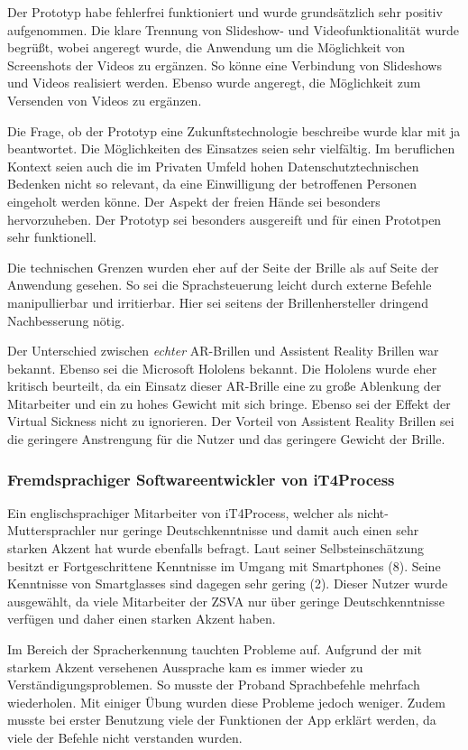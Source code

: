 Der Prototyp habe fehlerfrei funktioniert und wurde grundsätzlich sehr positiv aufgenommen. Die klare Trennung von Slideshow- und Videofunktionalität wurde begrüßt, wobei angeregt wurde, die Anwendung um die Möglichkeit von Screenshots der Videos zu ergänzen. So könne eine Verbindung von Slideshows und Videos realisiert werden. Ebenso wurde angeregt, die Möglichkeit zum Versenden von Videos zu ergänzen.

Die Frage, ob der Prototyp eine Zukunftstechnologie beschreibe wurde klar mit ja beantwortet. Die Möglichkeiten des Einsatzes seien sehr vielfältig. Im beruflichen Kontext seien auch die im Privaten Umfeld hohen Datenschutztechnischen Bedenken nicht so relevant, da eine Einwilligung der betroffenen Personen eingeholt werden könne. Der Aspekt der freien Hände sei besonders hervorzuheben. Der Prototyp sei besonders ausgereift und für einen Prototpen sehr funktionell.

Die technischen Grenzen wurden eher auf der Seite der Brille als auf Seite der Anwendung gesehen. So sei die Sprachsteuerung leicht durch externe Befehle manipullierbar und irritierbar. Hier sei seitens der Brillenhersteller dringend Nachbesserung nötig. 

Der Unterschied zwischen \emph{echter} AR-Brillen und Assistent Reality Brillen war bekannt. Ebenso sei die Microsoft Hololens bekannt. Die Hololens wurde eher kritisch beurteilt, da ein Einsatz dieser AR-Brille eine zu große Ablenkung der Mitarbeiter und ein zu hohes Gewicht mit sich bringe. Ebenso sei der Effekt der Virtual Sickness nicht zu ignorieren. Der Vorteil von Assistent Reality Brillen sei die geringere Anstrengung für die Nutzer und das geringere Gewicht der Brille.
%
%
\subsubsection{Fremdsprachiger Softwareentwickler von iT4Process}
%
Ein englischsprachiger Mitarbeiter von iT4Process, welcher als nicht-Muttersprachler nur geringe Deutschkenntnisse und damit auch einen sehr starken Akzent hat wurde ebenfalls befragt. Laut seiner Selbsteinschätzung besitzt er Fortgeschrittene Kenntnisse im Umgang mit Smartphones (8). Seine Kenntnisse von Smartglasses sind dagegen sehr gering (2). Dieser Nutzer wurde ausgewählt, da viele Mitarbeiter der ZSVA nur über geringe Deutschkenntnisse verfügen und daher einen starken Akzent haben.

Im Bereich der Spracherkennung tauchten Probleme auf. Aufgrund der mit starkem Akzent versehenen Aussprache kam es immer wieder zu Verständigungsproblemen. So musste der Proband Sprachbefehle mehrfach wiederholen. Mit einiger Übung wurden diese Probleme jedoch weniger. Zudem musste bei erster Benutzung viele der Funktionen der App erklärt werden, da viele der Befehle nicht verstanden wurden.

